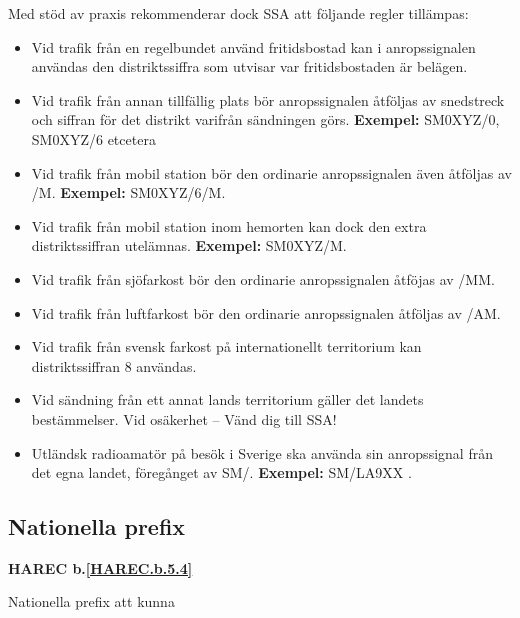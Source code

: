 Med stöd av praxis rekommenderar dock SSA att följande regler tillämpas:

\begin{itemize}
\item Vid trafik från en regelbundet använd fritidsbostad kan i
  anropssignalen användas den distriktssiffra som utvisar var
  fritidsbostaden är belägen.

\item Vid trafik från annan tillfällig plats bör anropssignalen
  åtföljas av snedstreck och siffran för det distrikt varifrån
  sändningen görs.
  \textbf{Exempel:} SM0XYZ/0, SM0XYZ/6 etcetera

\item Vid trafik från mobil station bör den ordinarie anropssignalen
  även åtföljas av /M.
  \textbf{Exempel:} SM0XYZ/6/M.

\item Vid trafik från mobil station inom hemorten kan dock den extra
  distriktssiffran utelämnas.
  \textbf{Exempel:} SM0XYZ/M.

\item Vid trafik från sjöfarkost bör den ordinarie anropssignalen
 åtföjas av /MM.

\item Vid trafik från luftfarkost bör den ordinarie anropssignalen
  åtföljas av /AM.

\item Vid trafik från svensk farkost på internationellt territorium
 kan distriktssiffran 8 användas.

\item Vid sändning från ett annat lands territorium gäller det landets
  bestämmelser.
  Vid osäkerhet -- Vänd dig till SSA!

\item Utländsk radioamatör på besök i Sverige ska använda sin
  anropssignal från det egna landet, föregånget av SM/. \textbf{Exempel:} SM/LA9XX \cite{TR6101}.
\end{itemize}

\subsection{Nationella prefix}
\textbf{HAREC 
	b.\ref{HAREC.b.5.4}\label{myHAREC.b.5.4}
}

Nationella prefix att kunna

